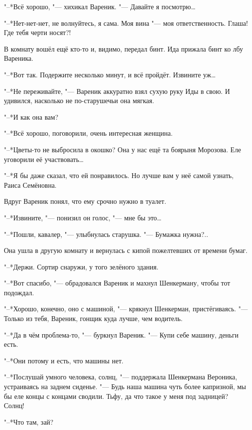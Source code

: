 "--*Всё хорошо, "--- хихикал Вареник.
"--- Давайте я посмотрю\dots{}

"--*Нет-нет-нет, не волнуйтесь, я сама.
Моя вина "--- моя ответственность.
Глаша!
Где тебя черти носят?!

В комнату вошёл ещё кто-то и, видимо, передал бинт.
Ида прижала бинт ко лбу Вареника.

"--*Вот так.
Подержите несколько минут, и всё пройдёт.
Извините уж\dots{}

"--*Не переживайте, "--- Вареник аккуратно взял сухую руку Иды в свою.
И удивился, насколько не по-старушечьи она мягкая.

\textspace

"--*И как она вам?

"--*Всё хорошо, поговорили, очень интересная женщина.

"--*Цветы-то не выбросила в окошко?
Она у нас ещё та боярыня Морозова.
Еле уговорили её участвовать\dots{}

"--*Я бы даже сказал, что ей понравилось.
Но лучше вам у неё самой узнать, Раиса Семёновна.

Вдруг Вареник понял, что ему срочно нужно в туалет.

"--*Извините, "--- понизил он голос, "--- мне бы это\dots{}

"--*Пошли, кавалер, "--- улыбнулась старушка.
"--- Бумажка нужна?..

Она ушла в другую комнату и вернулась с кипой пожелтевших от времени бумаг.

"--*Держи.
Сортир снаружи, у того зелёного здания.

"--*Вот спасибо, "--- обрадовался Вареник и махнул Шенкерману, чтобы тот подождал.

\textspace

\asterism

\textspace

"--*Хорошо, конечно, оно с машиной, "--- крякнул Шенкерман, пристёгиваясь.
"--- Только из тебя, Вареник, гонщик куда лучше, чем водитель.

"--*Да в чём проблема-то, "--- буркнул Вареник.
"--- Купи себе машину, деньги есть.

"--*Они потому и есть, что машины нет.

"--*Послушай умного человека, солнц, "--- поддержала Шенкермана Вероника, устраиваясь на заднем сиденье.
"--- Будь наша машина чуть более капризной, мы бы еле концы с концами сводили.
Тьфу, да что такое у меня под задницей?
Солнц!

"--*Что там, зай?

